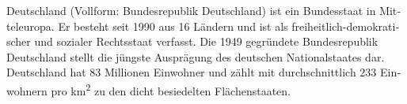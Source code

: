\begin{otherlanguage}{ngerman}
Deutschland (Vollform: Bundesrepublik Deutschland) ist ein Bundesstaat in Mitteleuropa. Er besteht seit 1990 aus 16 Ländern und ist als freiheitlich-demokratischer und sozialer Rechtsstaat verfasst. Die 1949 gegründete Bundesrepublik Deutschland stellt die jüngste Ausprägung des deutschen Nationalstaates dar. Deutschland hat 83 Millionen Einwohner und zählt mit durchschnittlich 233 Einwohnern pro \si{\square\kilo\meter} zu den dicht besiedelten Flächenstaaten.
\end{otherlanguage}

